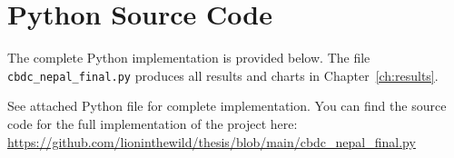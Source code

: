 \chapter{Python Source Code}
\label{app:a_code}

The complete Python implementation is provided below.
The file \texttt{cbdc\_nepal\_final.py} produces all
results and charts in Chapter~\ref{ch:results}.

% 

See attached Python file for complete implementation.
You can find the source code for the full implementation of the project here:
\href{https://github.com/lioninthewild/thesis/blob/main/cbdc_nepal_final.py}%
{https://github.com/lioninthewild/thesis/blob/main/cbdc\_nepal\_final.py}